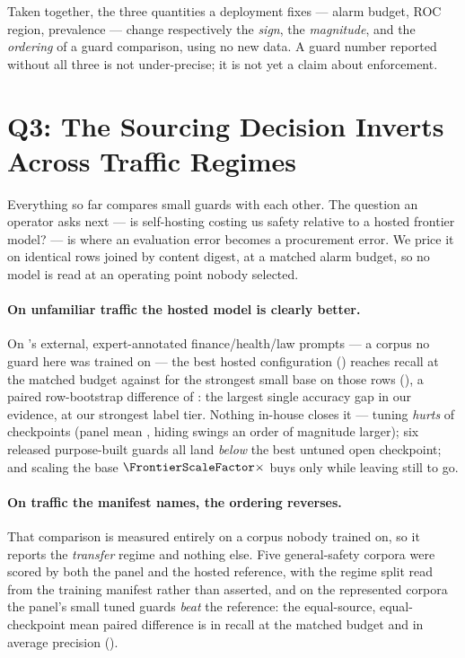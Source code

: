 \documentclass[manuscript,screen,review,anonymous]{acmart}
\begin{document}
Taken together, the three quantities a deployment fixes --- alarm budget, ROC region, prevalence ---
change respectively the \emph{sign}, the \emph{magnitude}, and the \emph{ordering} of a guard
comparison, using no new data. A guard number reported without all three is not under-precise; it is not
yet a claim about enforcement.

\section{Q3: The Sourcing Decision Inverts Across Traffic Regimes}
\label{sec:finding-regime}

Everything so far compares small guards with each other. The question an operator asks next --- is
self-hosting costing us safety relative to a hosted frontier model? --- is where an evaluation error
becomes a procurement error. We price it on identical rows joined by content digest, at a matched
\HtwoBudget{} alarm budget, so no model is read at an operating point nobody selected.

\paragraph{On unfamiliar traffic the hosted model is clearly better.}\leavevmode\newline On \citet{expguard2026}'s external,
expert-annotated finance/health/law prompts --- a corpus no guard here was trained on --- the best hosted
configuration (\FrontierBestName) reaches \FrontierBestTpr{} recall at the matched budget against
\FrontierBestBaseTpr{} for the strongest small base on those rows (\FrontierBestBaseName), a paired
row-bootstrap difference of \FrontierGainOverBase{} \FrontierGainOverBaseCI: the largest single accuracy
gap in our evidence, at our strongest label tier. Nothing in-house closes it --- tuning \emph{hurts}
\FrontierSftNumHurt{} of \FrontierSftNumTotal{} checkpoints (panel mean \FrontierSftMeanDelta, hiding
swings an order of magnitude larger); six released purpose-built guards all land \emph{below} the best
untuned open checkpoint; and scaling the base $\FrontierScaleFactor\times$ buys only
\FrontierScaleGain{} \FrontierScaleGainCI{} while leaving \FrontierGainOverOpen{}
\FrontierGainOverOpenCI{} still to go.

\paragraph{On traffic the manifest names, the ordering reverses.} That comparison is measured entirely on
a corpus nobody trained on, so it reports the \emph{transfer} regime and nothing else. Five
general-safety corpora were scored by both the panel and the hosted reference, with the regime split read
from the training manifest rather than asserted, and on the \HtwoNRepSources{} represented corpora the
panel's small tuned guards \emph{beat} the reference: the equal-source, equal-checkpoint mean paired
difference is \HtwoAggDeltaTpr{} \HtwoAggDeltaTprCI{} in recall at the matched budget and
\HtwoAggDeltaAp{} \HtwoAggDeltaApCI{} in average precision ().
\end{document}
